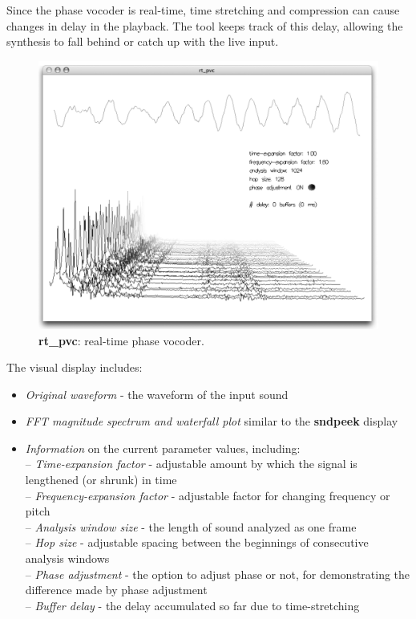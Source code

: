 \documentclass{article}
\begin{document}
Since the phase vocoder is real-time, time stretching and compression can cause changes in delay in the playback. The tool keeps track of this delay, allowing the synthesis to fall behind or catch up with the live input. 

\begin{figure}
\center
\includegraphics[width=\columnwidth]{rt_pvc_bw}
\caption{{\bf rt\_pvc}: real-time phase vocoder.}
\label{fig:f_pvc}
\end{figure}

The visual display includes: 
\begin{itemize}
\setlength{\itemsep}{-2pt}
\item \textit{Original waveform} - the waveform of the input sound
\item \textit{FFT magnitude spectrum and waterfall plot} similar to the {\bf sndpeek} display
\item \textit{Information} on the current parameter values, including:\\
	-- {\it Time-expansion factor} - adjustable amount by which the signal is lengthened (or shrunk) in time\\
	-- {\it Frequency-expansion factor} - adjustable factor for changing frequency or pitch\\
	-- {\it Analysis window size} - the length of sound analyzed as one frame\\
	-- {\it Hop size} - adjustable spacing between the beginnings of consecutive analysis windows\\
	-- {\it Phase adjustment} - the option to adjust phase or not, for demonstrating the difference made by phase adjustment\\
	-- {\it Buffer delay} - the delay accumulated so far due to time-stretching 
\end{itemize} 
\end{document}

